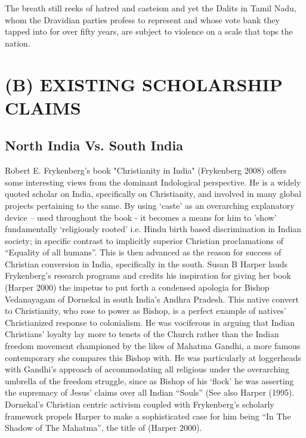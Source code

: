 The breath still reeks of hatred and casteism and yet the Dalits in Tamil Nadu, whom the Dravidian parties profess to represent and whose vote bank they tapped into for over fifty years, are subject to violence on a scale that tops the nation.

\vskip 2pt



\section*{(B) EXISTING SCHOLARSHIP CLAIMS}

\vskip 2pt

\subsection*{North India Vs. South India}

\vskip 2pt

Robert E. Frykenberg’s book "Christianity in India" (Frykenberg 2008) offers some interesting views from the dominant Indological perspective. He is a widely quoted scholar on India, specifically on Christianity, and involved in many global projects pertaining to the same. By using ‘caste’ as an overarching explanatory device – used throughout the book - it becomes a means for him to 'show' fundamentally ‘religiously rooted’ i.e. Hindu birth based discrimination in Indian society; in specific contrast to implicitly superior Christian proclamations of “Equality of all humans”. This is then advanced as the reason for success of Christian conversion in India, specifically in the south. Susan B Harper lauds Frykenberg’s research programs and credits his inspiration for giving her book (Harper 2000) the impetus to put forth a condensed apologia for Bishop Vedanayagam of Dornekal in south India’s Andhra Pradesh. This native convert to Christianity, who rose to power as Bishop, is a perfect example of natives’ Christianized response to colonialism. He was vociferous in arguing that Indian Christians’ loyalty lay more to tenets of the Church rather than the Indian freedom movement championed by the likes of Mahatma Gandhi, a more famous contemporary she compares this Bishop with. He was particularly at loggerheads with Gandhi’s approach of accommodating all religious under the overarching umbrella of the freedom struggle, since as Bishop of his ‘flock’ he was asserting the supremacy of Jesus’ claims over all Indian “Souls” (See also Harper (1995). Dornekal’s Christian centric activism coupled with Frykenberg’s scholarly framework propels Harper to make a sophisticated case for him being “In The Shadow of The Mahatma”, the title of (Harper 2000).

